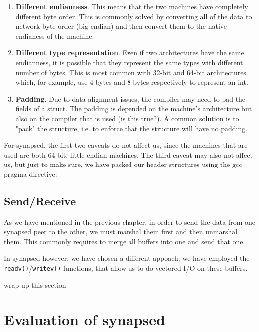 \begin{enumerate}
	\item \textbf{Different endianness}. This means that the two machines have 
		completely different byte order. This is commonly solved by converting 
		all of the data to network byte order (big endian) and then convert 
		them to the native endianess of the machine.
	\item \textbf{Different type representation}. Even if two architectures 
		have the same endianness, it is possible that they represent the same 
		types with different number of bytes. This is most common with 32-bit 
		and 64-bit architectures which, for example, use 4 bytes and 8 bytes 
		respectively to represent an int.
	\item \textbf{Padding}. Due to data alignment issues, the compiler may need 
		to pad the fields of a struct. The padding is depended on the machine's 
		architecture but also on the compiler that is used (\fixme is this 
		true?).  A common solution is to "pack" the structure, i.e. to enforce 
		that the structure will have no padding.
\end{enumerate}

For synapsed, the first two caveats do not affect us, since the machines that 
are used are both 64-bit, little endian machines. The third caveat may also not 
affect us, but just to make sure, we have packed our header structures using 
the gcc pragma directive:


\subsection{Send/Receive}

As we have mentioned in the previous chapter, in order to send the data from 
one synapsed peer to the other, we must marshal them first and then unmarshal 
them. This commonly requires to merge all buffers into one and send that one.  

In synapsed however, we have chosen a different appoach; we have employed the 
\texttt{readv()}/\texttt{writev()} functions, that allow us to do vectored I/O 
on these buffers.

\todo wrap up this section

\section{Evaluation of synapsed}

